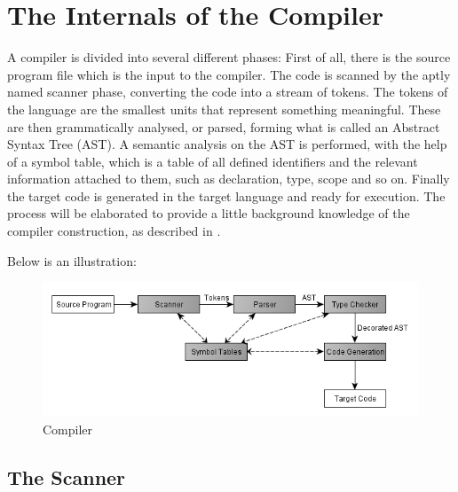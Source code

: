 \section{The Internals of the Compiler}

A compiler is divided into several different phases: First of all, there is the source program file which is the input to the compiler. The code is scanned by the aptly named scanner phase, converting the code into a stream of tokens. The tokens of the language are the smallest units that represent something meaningful. These are then grammatically analysed, or parsed, forming what is called an Abstract Syntax Tree (AST). A semantic analysis on the AST is performed, with the help of a symbol table, which is a table of all defined identifiers and the relevant information attached to them, such as declaration, type, scope and so on. Finally the target code is generated in the target language and ready for execution. The process will be elaborated to provide a little background knowledge of the compiler construction, as described in \cite{Fischer2010}.

Below is an illustration:

\begin{figure}[ht]
	\centering
		\includegraphics[scale = 0.5]{img/compiler.png}
	\caption{Compiler}
	\label{fig:compiler}
\end{figure}


\subsection{The Scanner}

